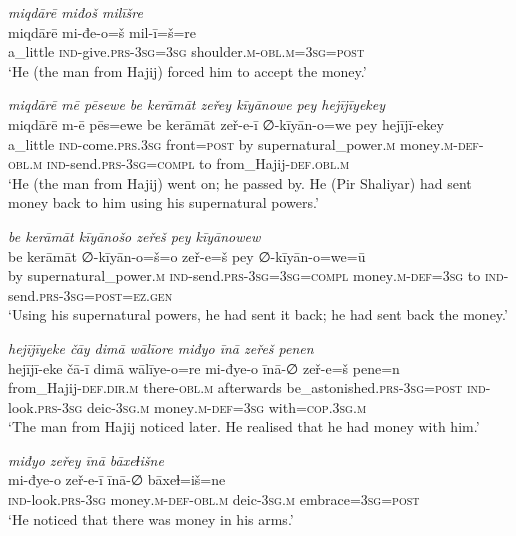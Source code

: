 \ea \label{ŽP.108}
\textit{miqdārē miđoš milīšre} \\ 
\gll miqdārē mi-đe-o=š mil-ī=š=re \\ 
 a\_little \textsc{ind-}give\textsc{.prs}\textsc{-3sg}\textsc{=3sg} shoulder\textsc{.m}\textsc{-obl}\textsc{.m}\textsc{=3sg}\textsc{=\textsc{post}} \\ 
\glt `He (the man from Hajij) forced him to accept the money.'
\z 
 
\ea \label{ŽP.109}
\textit{miqdārē mē pēsewe be kerāmāt zeřey kīyānowe pey hejījīyekey} \\ 
\gll miqdārē m-ē pēs=ewe be kerāmāt zeř-e-ī ∅-kīyān-o=we pey hejījī-ekey \\ 
 a\_little \textsc{ind-}come\textsc{.prs}\textsc{.3sg} front\textsc{=\textsc{post}} by supernatural\_power\textsc{.m} money\textsc{.m}\textsc{-def}\textsc{-obl}\textsc{.m} \textsc{ind-}send\textsc{.prs}\textsc{-3sg}\textsc{=compl} to from\_Hajij\textsc{-def}\textsc{.obl}\textsc{.m} \\ 
\glt `He (the man from Hajij) went on; he passed by. He (Pir Shaliyar) had sent money back to him using his supernatural powers.'
\z 
 
\ea \label{ŽP.110}
\textit{be kerāmāt kīyānošo zeřeš pey kīyānowew} \\ 
\gll be kerāmāt ∅-kīyān-o=š=o zeř-e=š pey ∅-kīyān-o=we=ū \\ 
 by supernatural\_power\textsc{.m} \textsc{ind-}send\textsc{.prs}\textsc{-3sg}\textsc{=3sg}\textsc{=compl} money\textsc{.m}\textsc{-def}\textsc{=3sg} to \textsc{ind-}send\textsc{.prs}\textsc{-3sg}\textsc{=\textsc{post}}\textsc{\textsc{=ez.gen}} \\ 
\glt `Using his supernatural powers, he had sent it back; he had sent back the money.'
\z 
 
\ea \label{ŽP.112}
\textit{hejījīyeke čāy dimā wālīore miđyo īnā zeřeš penen} \\ 
\gll hejījī-eke čā-ī dimā wālīye-o=re mi-đye-o īnā-∅ zeř-e=š pene=n \\ 
 from\_Hajij\textsc{-def}\textsc{.dir}\textsc{.m} there\textsc{-obl}\textsc{.m} afterwards be\_astonished\textsc{.prs}\textsc{-3sg}\textsc{=\textsc{post}} \textsc{ind-}look\textsc{.prs}\textsc{-3sg} deic\textsc{-3sg}\textsc{.m} money\textsc{.m}\textsc{-def}\textsc{=3sg} with\textsc{=cop}\textsc{.3sg}\textsc{.m} \\ 
\glt `The man from Hajij noticed later. He realised that he had money with him.'
\z 
 
\ea \label{ŽP.114}
\textit{miđyo zeřey īnā bāxeɫišne} \\ 
\gll mi-đye-o zeř-e-ī īnā-∅ bāxeɫ=iš=ne \\ 
 \textsc{ind-}look\textsc{.prs}\textsc{-3sg} money\textsc{.m}\textsc{-def}\textsc{-obl}\textsc{.m} deic\textsc{-3sg}\textsc{.m} embrace\textsc{=3sg}\textsc{=\textsc{post}} \\ 
\glt `He noticed that there was money in his arms.'
\z 
 
